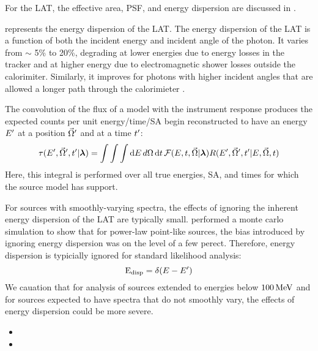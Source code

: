 For the \ac{LAT}, the effective area, \ac{PSF}, and energy dispersion
are discussed in .

\edisp represents the energy dispersion of the LAT.
The energy dispersion of the LAT is a function of both the
incident energy and incident angle of the photon. It varies
from $\sim$ 5\% to 20\%, degrading at lower energies due to energy
losses in the tracker and at higher energy due to electromagnetic
shower losses outside the calorimiter. Similarly, it improves
for photons with higher incident angles that are 
allowed a longer path through the calorimieter \citep{ackermann_2012a_fermi-large}.



The convolution of the flux of a model with the instrument response 
produces the expected counts per unit energy/time/\acl{SA}
begin reconstructed to have 
an energy $E'$ 
at a position $\vec\Omega'$ and at a time $t'$:
\begin{equation}
  \eqnlabel{eventrate}
  \eventrate(\energy',\solidangle',\time'|\modelparams)
  = \int \int \int \denergy \, \dsolidangle \, \dtime \,
  \fluxdensity(\energy,\time,\vec\Omega|\modelparams) \response(\energy',\solidangle',\time'|\energy,\solidangle,\time)
\end{equation}
Here, this integral is performed over all true energies, \acs{SA}, and times
for which the source model has support.



For sources with smoothly-varying spectra, the effects of ignoring
the inherent energy dispersion of the LAT are typically small.
\cite{ackermann_2012a_fermi-large} performed a monte carlo simulation to show
that for power-law point-like sources, the bias introduced by ignoring
energy dispersion was on the level of a few perect.  Therefore, energy
dispersion is typicially ignored for standard likelihood analysis:
\begin{equation}
\text{E}_\text{disp} = \delta(E-E')
\end{equation}
We cauation that for analysis of sources extended to energies below
$100\,\text{MeV}$ and for sources expected to have spectra that do
not smoothly vary, the effects of energy dispersion could be more severe.

\begin{itemize}
  \item {}
\item {}
\end{itemize}


